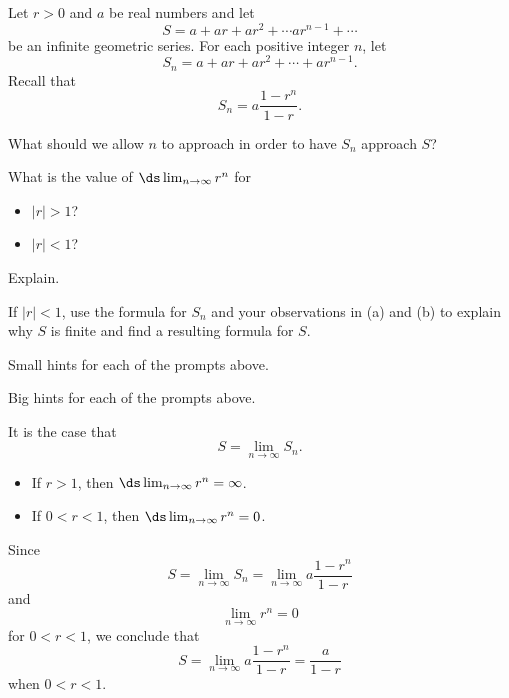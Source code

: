 \begin{activity} \label{8.2.Act2} Let $r > 0$ and $a$ be real numbers and let
\[S = a+ar+ar^2 + \cdots ar^{n-1} + \cdots \]
be an infinite geometric series. For each positive integer $n$, let
\[S_n = a+ar+ar^2 + \cdots + ar^{n-1}.\]
Recall that
\[S_n = a\frac{1-r^n}{1-r}.\]
\ba
\item What should we allow $n$ to approach in order to have $S_n$ approach $S$?

\item What is the value of  $\ds \lim_{n \to \infty} r^n$ for
\begin{itemize}
\item $|r| > 1$?
\item $|r| < 1$?
\end{itemize}
Explain.



\item If $|r| < 1$, use the formula for $S_n$ and your observations in (a) and (b) to explain why $S$ is finite and find a resulting formula for $S$.



\ea
\end{activity}

\begin{smallhint}
\ba
	\item Small hints for each of the prompts above.
\ea
\end{smallhint}
\begin{bighint}
\ba
	\item Big hints for each of the prompts above.
\ea
\end{bighint}
\begin{activitySolution}
\ba
	\item It is the case that
\[S = \lim_{n \to \infty} S_n.\]
    \item 
\begin{itemize}
\item If $r > 1$, then $\ds \lim_{n \to \infty} r^n = \infty$.
\item If $0 < r < 1$, then $\ds \lim_{n \to \infty} r^n = 0$.
\end{itemize}
    \item Since
\[S = \lim_{n \to \infty} S_n = \lim_{n \to \infty} a\frac{1-r^n}{1-r}\]
and
\[\lim_{n \to \infty} r^n = 0\]
for $0 < r < 1$, we conclude that
\[S = \lim_{n \to \infty} a\frac{1-r^n}{1-r} = \frac{a}{1-r}\]
when $0 < r < 1$.


\ea
\end{activitySolution}
\aftera 